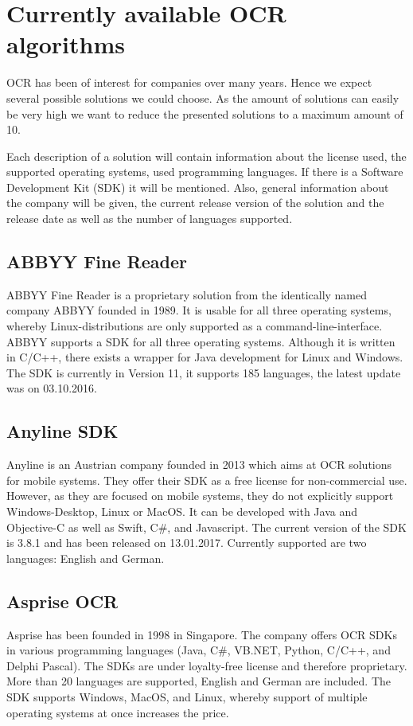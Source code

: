 \section{Currently available OCR algorithms}
\label{sec3.1}

OCR has been of interest for companies over many years. Hence we expect several possible solutions we could choose. As the amount of solutions can easily be very high we want to reduce the presented solutions to a maximum amount of 10.

Each description of a solution will contain information about the license used, the supported operating systems, used programming languages. If there is a Software Development Kit (SDK) it will be mentioned. Also, general information about the company will be given, the current release version of the solution and the release date as well as the number of languages supported.

\subsection{ABBYY Fine Reader}
\label{sec3.1.1}

ABBYY Fine Reader is a proprietary solution from the identically named company ABBYY founded in 1989. It is usable for all three operating systems, whereby Linux-distributions are only supported as a command-line-interface. ABBYY supports a SDK for all three operating systems. Although it is written in C/C++, there exists a wrapper for Java development for Linux and Windows\cite{abbyy16}. 
The SDK is currently in Version 11, it supports 185 languages, the latest update was on 03.10.2016.

\subsection{Anyline SDK}
\label{sec3.1.2}

Anyline is an Austrian company founded in 2013 which aims at OCR solutions for mobile systems. They offer their SDK as a free license for non-commercial use. However, as they are focused on mobile systems, they do not explicitly support Windows-Desktop, Linux or MacOS. It can be developed with Java and Objective-C as well as Swift, C\#, and Javascript. The current version of the SDK is 3.8.1 and has been released on 13.01.2017. Currently supported are two languages: English and German.

\subsection{Asprise OCR}
\label{sec3.1.3}
Asprise has been founded in 1998 in Singapore. The company offers OCR SDKs in various programming languages (Java, C\#, VB.NET, Python, C/C++, and Delphi Pascal). The SDKs are under loyalty-free license and therefore proprietary. More than 20 languages are supported, English and German are included.
The SDK supports Windows, MacOS, and Linux, whereby support of multiple operating systems at once increases the price.

